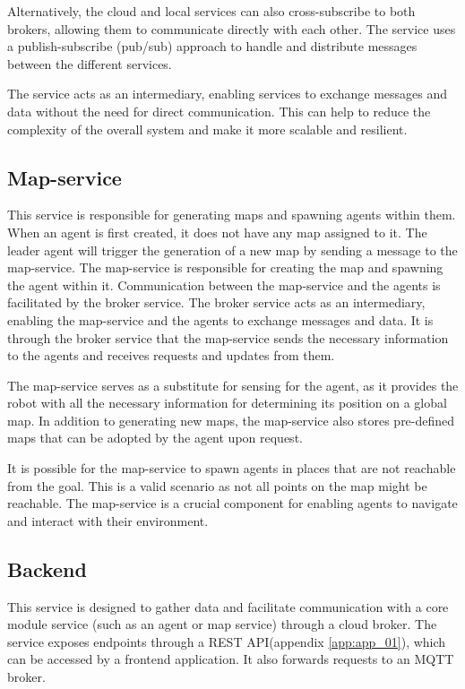 Alternatively, the cloud and local services can also cross-subscribe to both brokers, allowing them to communicate directly with each other. The service uses a publish-subscribe (pub/sub) approach to handle and distribute messages between the different services.

The service acts as an intermediary, enabling services to exchange messages and data without the need for direct communication. This can help to reduce the complexity of the overall system and make it more scalable and resilient.

\subsection{Map-service}
This service is responsible for generating maps and spawning agents within them. When an agent is first created, it does not have any map assigned to it. The leader agent will trigger the generation of a new map by sending a message to the map-service. The map-service is responsible for creating the map and spawning the agent within it. Communication between the map-service and the agents is facilitated by the broker service. The broker service acts as an intermediary, enabling the map-service and the agents to exchange messages and data. It is through the broker service that the map-service sends the necessary information to the agents and receives requests and updates from them.

The map-service serves as a substitute for sensing for the agent, as it provides the robot with all the necessary information for determining its position on a global map. In addition to generating new maps, the map-service also stores pre-defined maps that can be adopted by the agent upon request.

It is possible for the map-service to spawn agents in places that are not reachable from the goal. This is a valid scenario as not all points on the map might be reachable. The map-service is a crucial component for enabling agents to navigate and interact with their environment.

\subsection{Backend}
This service is designed to gather data and facilitate communication with a core module service (such as an agent or map service) through a cloud broker. The service exposes endpoints through a REST API(appendix \ref{app:app_01}), which can be accessed by a frontend application. It also forwards requests to an MQTT broker.

